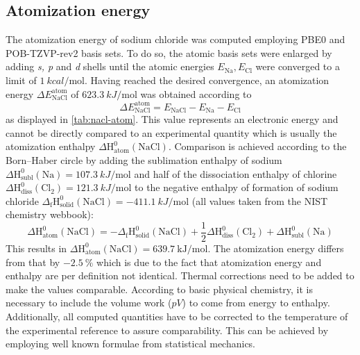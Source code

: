 \documentclass[a4paper,12pt,parskip=half]{scrartcl}
\begin{document}
\subsection{Atomization energy}
%
The atomization energy of sodium chloride was computed employing PBE0 and POB-TZVP-rev2 basis sets\autocite[]{pob-xzvp-rev2}. To do so, the atomic basis sets were enlarged by adding \textit{s, p} and \textit{d} shells until the atomic energies $ E_\mathrm{Na}, E_\mathrm{Cl} $ were converged to a limit of $ \SI{1}{kcal \per \mole} $. Having reached the desired convergence, an atomization energy $ \Delta E_\mathrm{NaCl}^\mathrm{atom} $ of $\SI{623.3}{kJ \per \mole} $ was obtained according to
%
\begin{equation}
	\Delta E_\mathrm{NaCl}^\mathrm{atom} = E_\mathrm{NaCl} - E_\mathrm{Na} - E_\mathrm{Cl}
\end{equation}
%
as displayed in \autoref{tab:nacl-atom}. This value represents an electronic energy and cannot be directly compared to an experimental quantity which is usually the atomization enthalpy $ \Delta \mathrm{H^{0}_{atom}(NaCl)} $. Comparison is achieved according to the Born--Haber circle by adding the sublimation enthalpy of sodium $ \Delta \mathrm{H^{0}_{subl}(Na)} = \SI{107.3}{kJ \per \mole} $ and half of the dissociation enthalpy of chlorine $ \Delta \mathrm{H^{0}_{diss}(Cl_2)} = \SI{121.3}{kJ \per \mole}  $ to the negative enthalpy of formation of sodium chloride $ \Delta \mathrm{_f H^{0}_{solid}(NaCl)} = \SI{-411.1}{kJ \per \mole}$ (all values taken from the NIST chemistry webbook\autocite[]{nist}):
%
\begin{equation}
	\Delta \mathrm{H^{0}_{atom}(NaCl)} = - \Delta \mathrm{_f H^{0}_{solid}(NaCl)} + \frac{1}{2}\Delta \mathrm{H^{0}_{diss}(Cl_2)} + \Delta \mathrm{H^{0}_{subl}(Na)}
\end{equation}
%
This results in $ \Delta \mathrm{H^{0}_{atom}(NaCl)} = \SI{639.7}{\kilo\joule\per\mole}$. The atomization energy differs from that by $ \SI{-2.5}{\percent} $ which is due to the fact that atomization energy and enthalpy are per definition not identical. Thermal corrections need to be added to make the values comparable. According to basic physical chemistry, it is necessary to include the volume work ($ pV $) to come from energy to enthalpy. Additionally, all computed quantities have to be corrected to the temperature of the experimental reference to assure comparability. This can be achieved by employing well known formulae from statistical mechanics.
%
\end{document}
